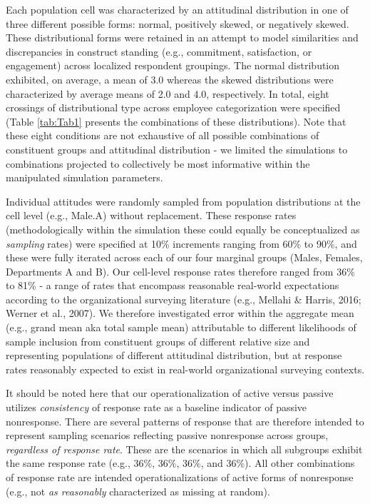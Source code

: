 \documentclass[
  man,mask]{apa7}
\begin{document}
Each population cell was characterized by an attitudinal distribution in one of three different possible forms: normal, positively skewed, or negatively skewed. These distributional forms were retained in an attempt to model similarities and discrepancies in construct standing (e.g., commitment, satisfaction, or engagement) across localized respondent groupings. The normal distribution exhibited, on average, a mean of 3.0 whereas the skewed distributions were characterized by average means of 2.0 and 4.0, respectively. In total, eight crossings of distributional type across employee categorization were specified (Table \ref{tab:Tab1} presents the combinations of these distributions). Note that these eight conditions are not exhaustive of all possible combinations of constituent groups and attitudinal distribution - we limited the simulations to combinations projected to collectively be most informative within the manipulated simulation parameters.

Individual attitudes were randomly sampled from population distributions at the cell level (e.g., Male.A) without replacement. These response rates (methodologically within the simulation these could equally be conceptualized as \emph{sampling} rates) were specified at 10\% increments ranging from 60\% to 90\%, and these were fully iterated across each of our four marginal groups (Males, Females, Departments A and B). Our cell-level response rates therefore ranged from 36\% to 81\% - a range of rates that encompass reasonable real-world expectations according to the organizational surveying literature (e.g., Mellahi \& Harris, 2016; Werner et al., 2007). We therefore investigated error within the aggregate mean (e.g., grand mean aka total sample mean) attributable to different likelihoods of sample inclusion from constituent groups of different relative size and representing populations of different attitudinal distribution, but at response rates reasonably expected to exist in real-world organizational surveying contexts.

It should be noted here that our operationalization of active versus passive utilizes \emph{consistency} of response rate as a baseline indicator of passive nonresponse. There are several patterns of response that are therefore intended to represent sampling scenarios reflecting passive nonresponse across groups, \emph{regardless of response rate}. These are the scenarios in which all subgroups exhibit the same response rate (e.g., 36\%, 36\%, 36\%, and 36\%). All other combinations of response rate are intended operationalizations of active forms of nonresponse (e.g., not \emph{as reasonably} characterized as missing at random).
\end{document}
